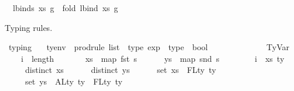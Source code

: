 \begin{isabellebody}
\ \ {\isachardoublequoteopen}lbinds\ xs\ g\ {\isacharequal}{\kern0pt}\ fold\ lbind\ xs\ g{\isachardoublequoteclose}%
\begin{isamarkuptext}%
Typing rules.%
\end{isamarkuptext}\isamarkuptrue%
\isamarkupfalse%
\ typing\ {\isacharcolon}{\kern0pt}{\isacharcolon}{\kern0pt}\isanewline
\ \ {\isachardoublequoteopen}tyenv\ {\isacharequal}{\kern0pt}{\isachargreater}{\kern0pt}\ prodrule\ list\ {\isacharequal}{\kern0pt}{\isachargreater}{\kern0pt}\ type\ exp\ {\isacharequal}{\kern0pt}{\isachargreater}{\kern0pt}\ type\ {\isacharequal}{\kern0pt}{\isachargreater}{\kern0pt}\ bool{\isachardoublequoteclose}\isanewline
\ \ {\isacharparenleft}{\kern0pt}{\isacartoucheopen}{\isacharunderscore}{\kern0pt}\ {\isasymturnstile}{\isacharbraceleft}{\kern0pt}{\isacharunderscore}{\kern0pt}{\isacharbraceright}{\kern0pt}\ {\isacharunderscore}{\kern0pt}\ {\isacharcolon}{\kern0pt}\ {\isacharunderscore}{\kern0pt}{\isacartoucheclose}\ {\isacharbrackleft}{\kern0pt}{}{}{\isacharcomma}{\kern0pt}\ {}{}{\isacharcomma}{\kern0pt}\ {}{}{\isacharcomma}{\kern0pt}\ {}{}{\isacharbrackright}{\kern0pt}\ {}{}{\isacharparenright}{\kern0pt}\isanewline
{}\isanewline
\ \ TyVar{\isacharcolon}{\kern0pt}\isanewline
\ \ \ \ {\isachardoublequoteopen}i\ {\isacharless}{\kern0pt}\ length\ {\isasymGamma}\ {\isacharequal}{\kern0pt}{\isacharequal}{\kern0pt}{\isachargreater}{\kern0pt}\isanewline
\ \ \ \ \ xs\ {\isacharequal}{\kern0pt}\ map\ fst\ s\ {\isacharequal}{\kern0pt}{\isacharequal}{\kern0pt}{\isachargreater}{\kern0pt}\isanewline
\ \ \ \ \ ys\ {\isacharequal}{\kern0pt}\ map\ snd\ s\ {\isacharequal}{\kern0pt}{\isacharequal}{\kern0pt}{\isachargreater}{\kern0pt}\isanewline
\ \ \ \ \ {\isasymGamma}\ {\isacharbang}{\kern0pt}\ i\ {\isacharequal}{\kern0pt}\ {\isacharparenleft}{\kern0pt}xs{\isacharcomma}{\kern0pt}\ ty{\isacharparenright}{\kern0pt}\ {\isacharequal}{\kern0pt}{\isacharequal}{\kern0pt}{\isachargreater}{\kern0pt}\isanewline
\ \ \ \ \ distinct\ xs\ {\isacharequal}{\kern0pt}{\isacharequal}{\kern0pt}{\isachargreater}{\kern0pt}\isanewline
\ \ \ \ \ distinct\ ys\ {\isacharequal}{\kern0pt}{\isacharequal}{\kern0pt}{\isachargreater}{\kern0pt}\isanewline
\ \ \ \ \ set\ xs\ {\isacharequal}{\kern0pt}\ FLty\ ty\ {\isacharequal}{\kern0pt}{\isacharequal}{\kern0pt}{\isachargreater}{\kern0pt}\isanewline
\ \ \ \ \ set\ ys\ {\isasyminter}\ ALty\ ty\ {\isacharminus}{\kern0pt}\ FLty\ ty\ {\isacharequal}{\kern0pt}\ {\isacharbraceleft}{\kern0pt}{\isacharbraceright}{\kern0pt}\ {\isacharequal}{\kern0pt}{\isacharequal}{\kern0pt}{\isachargreater}{\kern0pt}\isanewline

\end{isabellebody}
